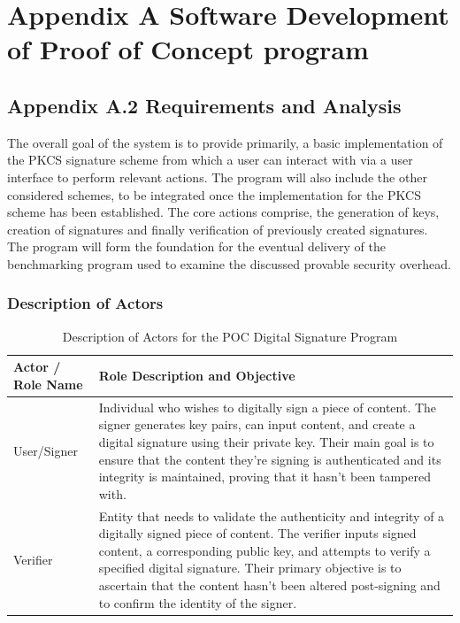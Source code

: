 \documentclass[]{final_report}
\theoremstyle{definition}
\begin{document}
\tableofcontents{}\newpage





\chapter{Appendix A Software Development of Proof of Concept program}



\section{Appendix A.2 Requirements and Analysis}
The overall goal of the system is to provide primarily, a basic implementation of the PKCS signature scheme from which a user can interact with via a user interface to perform relevant actions. The program will also include the other considered schemes, to be integrated once the implementation for the PKCS scheme has been established.
The core actions comprise, the generation of keys, creation of signatures and finally verification of previously created signatures. 
The program will form the foundation for the eventual delivery of the benchmarking program used to examine the discussed provable security overhead.

\subsection{Description of Actors}
\begin{table}[H]
    \centering
    \caption{Description of Actors for the POC Digital Signature Program}
    \label{tab:actors_description}
    \begin{tabular}{|l|p{10cm}|}
    \hline
    \textbf{Actor / Role Name} & \textbf{Role Description and Objective} \\
    \hline
    User/Signer & Individual who wishes to digitally sign a piece of content. The signer generates key pairs, can input content, and create a digital signature using their private key. Their main goal is to ensure that the content they're signing is authenticated and its integrity is maintained, proving that it hasn't been tampered with. \\
    \hline
    Verifier & Entity that needs to validate the authenticity and integrity of a digitally signed piece of content. The verifier inputs signed content, a corresponding public key, and attempts to verify a specified digital signature. Their primary objective is to ascertain that the content hasn't been altered post-signing and to confirm the identity of the signer. \\
    \hline
    \end{tabular}
\end{table}
\end{document}
